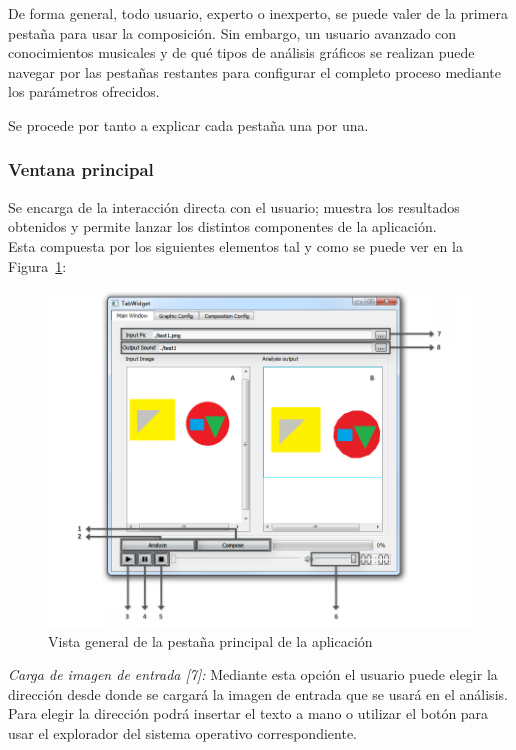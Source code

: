 		De forma general, todo usuario, experto o inexperto, se puede valer de la primera pestaña para usar la composición. Sin embargo, un usuario avanzado con conocimientos musicales y de qué tipos de análisis gráficos se realizan puede navegar por las pestañas restantes para configurar el completo proceso mediante los parámetros ofrecidos.
		
		Se procede por tanto a explicar cada pestaña una por una.

		\subsubsection{Ventana principal}
		
		Se encarga de la interacción directa con el usuario; muestra los resultados obtenidos y permite lanzar los distintos componentes de la aplicación. 
		\\Esta compuesta por los siguientes elementos tal y como se puede ver en la Figura~\ref{fig:interfaz}:\\
		
		
		\begin{figure}[htbp]
		\centering
		\hspace*{-0.9in}
		\includegraphics[scale=0.57]{graphics/interfaz.png}
		\caption{Vista general de la pestaña principal de la aplicación}
		\label{fig:interfaz}
		\end{figure}
		
		\noindent\textit{Carga de imagen de entrada [7]:}  Mediante esta opción el usuario puede elegir la dirección desde donde se cargará la imagen de entrada que se usará en el análisis. Para elegir la dirección podrá insertar el texto a mano o utilizar el botón para usar el explorador del sistema operativo correspondiente.\\
		
